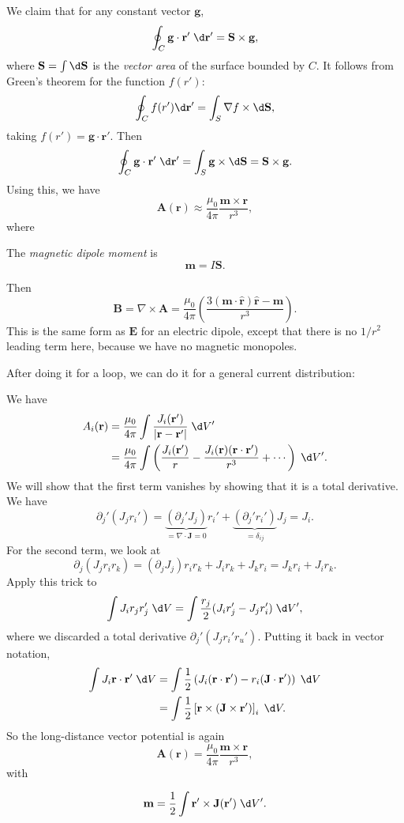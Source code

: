 \documentclass[a4paper]{article}
\begin{document}
\begin{eg}
  We claim that for any constant vector $\mathbf{g}$,
  \[
    \oint_C \mathbf{g}\cdot \mathbf{r}' \;\d \mathbf{r}' = \mathbf{S}\times \mathbf{g},
  \]
  where $\mathbf{S} = \int \d \mathbf{\mathbf{S}}$ is the \emph{vector area} of the surface bounded by $C$. It follows from Green's theorem for the function $f(r')$:
  \[
    \oint_C f(r')\d \mathbf{r}' = \int_S \nabla f\times\d \mathbf{S},
  \]
  taking $f(r') = \mathbf{g}\cdot \mathbf{r}'$. Then
  \[
    \oint_C \mathbf{g}\cdot \mathbf{r}'\;\d \mathbf{r}' = \int_S \mathbf{g}\times \d \mathbf{S} = \mathbf{S}\times \mathbf{g}.
  \]
  Using this, we have
  \[
    \mathbf{A}(\mathbf{r}) \approx \frac{\mu_0}{4\pi}\frac{\mathbf{m}\times \mathbf{r}}{r^3},
  \]
  where
  \begin{defi} The \emph{magnetic dipole moment} is
    \[
      \mathbf{m} = I\mathbf{S}.
    \]
  \end{defi}
  Then
  \[
    \mathbf{B} = \nabla\times \mathbf{A} = \frac{\mu_0}{4\pi}\left(\frac{3(\mathbf{m}\cdot \hat{\mathbf{r}})\hat{\mathbf{r}} - \mathbf{m}}{r^3}\right).
  \]
  This is the same form as $\mathbf{E}$ for an electric dipole, except that there is no $1/r^2$ leading term here, because we have no magnetic monopoles.
\end{eg}

After doing it for a loop, we can do it for a general current distribution:
\begin{eg}
  We have
  \begin{align*}
    A_i(\mathbf{r}) &= \frac{\mu_0}{4\pi}\int \frac{J_i(\mathbf{r}')}{|\mathbf{r} - \mathbf{r}'|}\;\d V'\\
    &= \frac{\mu_0}{4\pi}\int\left(\frac{J_i(\mathbf{r}')}{r} - \frac{J_i(\mathbf{r})(\mathbf{r}\cdot \mathbf{r}')}{r^3} + \cdots\right)\;\d V'.
  \end{align*}
  We will show that the first term vanishes by showing that it is a total derivative. We have
  \[
    \partial_j'(J_jr_i') = \underbrace{(\partial_j'J_j)}_{=\nabla\cdot \mathbf{J} = 0}r_i' + \underbrace{(\partial_j'r_i')}_{=\delta_{ij}}J_j = J_i.
  \]
  For the second term, we look at
  \[
    \partial_j (J_jr_ir_k) = (\partial_jJ_j)r_ir_k + J_ir_k + J_kr_i =J_kr_i + J_ir_k.
  \]
  Apply this trick to
  \[
    \int J_ir_jr'_j \;\d V = \int \frac{r_j}{2}(J_i r_j' - J_j r'_i)\;\d V',
  \]
  where we discarded a total derivative $\partial_j'(J_jr_i'r_u')$. Putting it back in vector notation,
  \begin{align*}
    \int J_i\mathbf{r}\cdot \mathbf{r}'\;\d V &= \int\frac{1}{2}\left(J_i(\mathbf{r}\cdot \mathbf{r}') - r_i(\mathbf{J}\cdot \mathbf{r}')\right)\;\d V\\
    &= \int \frac{1}{2}\left[\mathbf{r}\times (\mathbf{J}\times \mathbf{r}')\right]_i\;\d V.
  \end{align*}
  So the long-distance vector potential is again
  \[
    \mathbf{A} (\mathbf{r}) = \frac{\mu_0}{4\pi}\frac{\mathbf{m}\times \mathbf{r}}{r^3},
  \]
  with
  \begin{defi}
    \[
      \mathbf{m} = \frac{1}{2}\int \mathbf{r}'\times \mathbf{J}(\mathbf{r}')\;\d V'.
    \]
  \end{defi}
\end{eg}
\end{document}
